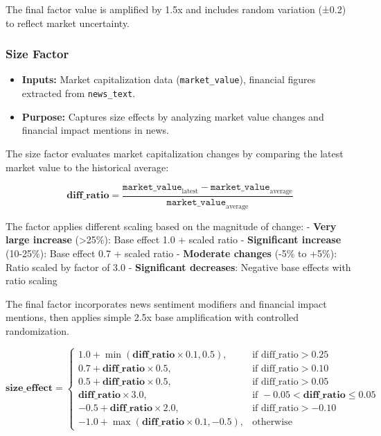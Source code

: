 \documentclass[3p,times,procedia]{elsarticle}
\begin{document}
The final factor value is amplified by 1.5x and includes random variation (±0.2) to reflect market uncertainty.

\subsubsection{{Size Factor}}
\begin{itemize}
    \item \textbf{Inputs:} Market capitalization data (\texttt{market\_value}), financial figures extracted from \texttt{news\_text}.
    \item \textbf{Purpose:} Captures size effects by analyzing market value changes and financial impact mentions in news.
\end{itemize}

The size factor evaluates market capitalization changes by comparing the latest market value to the historical average:

\begin{equation}
\textbf{diff\_ratio} = \frac{\texttt{market\_value}_{\text{latest}} - \texttt{market\_value}_{\text{average}}}{\texttt{market\_value}_{\text{average}}}
\end{equation}

The factor applies different scaling based on the magnitude of change:
- \textbf{Very large increase} (>25\%): Base effect 1.0 + scaled ratio
- \textbf{Significant increase} (10-25\%): Base effect 0.7 + scaled ratio  
- \textbf{Moderate changes} (-5\% to +5\%): Ratio scaled by factor of 3.0
- \textbf{Significant decreases}: Negative base effects with ratio scaling

The final factor incorporates news sentiment modifiers and financial impact mentions, then applies simple 2.5x base amplification with controlled randomization.

\begin{equation}
\textbf{size\_effect} = 
\begin{cases} 
1.0 + \min(\textbf{diff\_ratio} \times 0.1, 0.5), & \text{if diff\_ratio} > 0.25 \\
0.7 + \textbf{diff\_ratio} \times 0.5, & \text{if diff\_ratio} > 0.10 \\
0.5 + \textbf{diff\_ratio} \times 0.5, & \text{if diff\_ratio} > 0.05 \\
\textbf{diff\_ratio} \times 3.0, & \text{if } -0.05 < \textbf{diff\_ratio} \leq 0.05 \\
-0.5 + \textbf{diff\_ratio} \times 2.0, & \text{if diff\_ratio} > -0.10 \\
-1.0 + \max(\textbf{diff\_ratio} \times 0.1, -0.5), & \text{otherwise}
\end{cases}
\end{equation}
\end{document}
